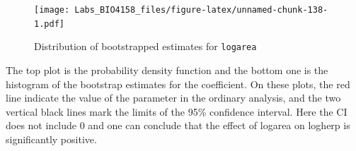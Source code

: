 \documentclass[
  12pt,
]{book}
\newenvironment{Shaded}{\begin{snugshade}}{\end{snugshade}}
\newcommand{\CommentTok}[1]{\textcolor[rgb]{0.56,0.35,0.01}{\textit{#1}}}
\newcommand{\ControlFlowTok}[1]{\textcolor[rgb]{0.13,0.29,0.53}{\textbf{#1}}}
\newcommand{\DataTypeTok}[1]{\textcolor[rgb]{0.13,0.29,0.53}{#1}}
\newcommand{\DecValTok}[1]{\textcolor[rgb]{0.00,0.00,0.81}{#1}}
\newcommand{\FloatTok}[1]{\textcolor[rgb]{0.00,0.00,0.81}{#1}}
\newcommand{\KeywordTok}[1]{\textcolor[rgb]{0.13,0.29,0.53}{\textbf{#1}}}
\newcommand{\NormalTok}[1]{#1}
\newcommand{\OperatorTok}[1]{\textcolor[rgb]{0.81,0.36,0.00}{\textbf{#1}}}
\newcommand{\OtherTok}[1]{\textcolor[rgb]{0.56,0.35,0.01}{#1}}
\newcommand{\StringTok}[1]{\textcolor[rgb]{0.31,0.60,0.02}{#1}}
\begin{document}
\begin{Shaded}
\end{Shaded}

\begin{figure}
\centering
\texttt{[image: Labs\_BIO4158\_files/figure-latex/unnamed-chunk-138-1.pdf]}
\caption{\label{fig:unnamed-chunk-138}Distribution of bootstrapped estimates for \texttt{logarea}}
\end{figure}

The top plot is the probability density function and the bottom one is the histogram of the bootstrap estimates for the coefficient. On these plots, the red line indicate the value of the parameter in the ordinary analysis, and the two vertical black lines mark the limits of the 95\% confidence interval. Here the CI does not include 0 and one can conclude that the effect of logarea on logherp is significantly positive.
\end{document}
